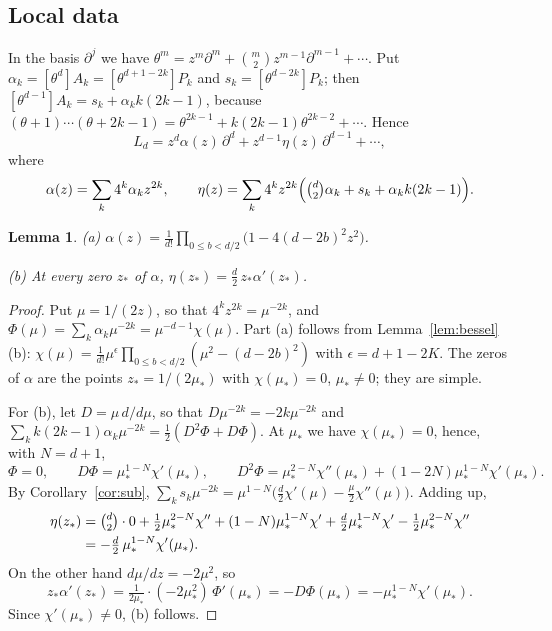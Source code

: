 \documentclass[11pt]{amsart}
\newtheorem{lemma}[thm]{Lemma}
\theoremstyle{definition}
\begin{document}
\subsection{Local data}
In the basis $\partial^j$ we have $\theta^m=z^m\partial^m+\binom m2z^{m-1}\partial^{m-1}+\cdots$. Put $\alpha_k=[\theta^d]A_k=[\theta^{d+1-2k}]P_k$ and $s_k=[\theta^{d-2k}]P_k$; then $[\theta^{d-1}]A_k=s_k+\alpha_kk(2k-1)$, because $(\theta+1)\cdots(\theta+2k-1)=\theta^{2k-1}+k(2k-1)\theta^{2k-2}+\cdots$. Hence
\begin{equation}\label{eq:dform}
L_d=z^d\alpha(z)\,\partial^d+z^{d-1}\eta(z)\,\partial^{d-1}+\cdots,
\end{equation}
where
\[
\alpha(z)=\sum_k4^k\alpha_kz^{2k},\qquad\eta(z)=\sum_k4^kz^{2k}\Bigl(\tbinom d2\alpha_k+s_k+\alpha_kk(2k-1)\Bigr).
\]

\begin{lemma}\label{lem:alpha}
\textup{(a)} $\alpha(z)=\frac1{d!}\prod_{0\le b<d/2}\bigl(1-4(d-2b)^2z^2\bigr)$.

\textup{(b)} At every zero $z_*$ of $\alpha$, $\eta(z_*)=\frac d2\,z_*\alpha'(z_*)$.
\end{lemma}

\begin{proof}
Put $\mu=1/(2z)$, so that $4^kz^{2k}=\mu^{-2k}$, and $\Phi(\mu)=\sum_k\alpha_k\mu^{-2k}=\mu^{-d-1}\chi(\mu)$. Part (a) follows from Lemma~\ref{lem:bessel}(b): $\chi(\mu)=\frac1{d!}\mu^\epsilon\prod_{0\le b<d/2}(\mu^2-(d-2b)^2)$ with $\epsilon=d+1-2K$. The zeros of $\alpha$ are the points $z_*=1/(2\mu_*)$ with $\chi(\mu_*)=0$, $\mu_*\ne0$; they are simple.

For (b), let $D=\mu\,d/d\mu$, so that $D\mu^{-2k}=-2k\mu^{-2k}$ and $\sum_kk(2k-1)\alpha_k\mu^{-2k}=\frac12(D^2\Phi+D\Phi)$. At $\mu_*$ we have $\chi(\mu_*)=0$, hence, with $N=d+1$,
\[
\Phi=0,\qquad D\Phi=\mu_*^{1-N}\chi'(\mu_*),\qquad D^2\Phi=\mu_*^{2-N}\chi''(\mu_*)+(1-2N)\mu_*^{1-N}\chi'(\mu_*).
\]
By Corollary~\ref{cor:sub}, $\sum_ks_k\mu^{-2k}=\mu^{1-N}\bigl(\frac d2\chi'(\mu)-\frac\mu2\chi''(\mu)\bigr)$. Adding up,
\begin{align*}
\eta(z_*)&=\tbinom d2\cdot0+\tfrac12\mu_*^{2-N}\chi''+(1-N)\mu_*^{1-N}\chi'+\tfrac d2\mu_*^{1-N}\chi'-\tfrac12\mu_*^{2-N}\chi''\\
&=-\tfrac d2\,\mu_*^{1-N}\chi'(\mu_*).
\end{align*}
On the other hand $d\mu/dz=-2\mu^2$, so
\[
z_*\alpha'(z_*)=\tfrac1{2\mu_*}\cdot(-2\mu_*^2)\,\Phi'(\mu_*)=-D\Phi(\mu_*)=-\mu_*^{1-N}\chi'(\mu_*).
\] Since $\chi'(\mu_*)\ne0$, (b) follows.
\end{proof}
\end{document}
